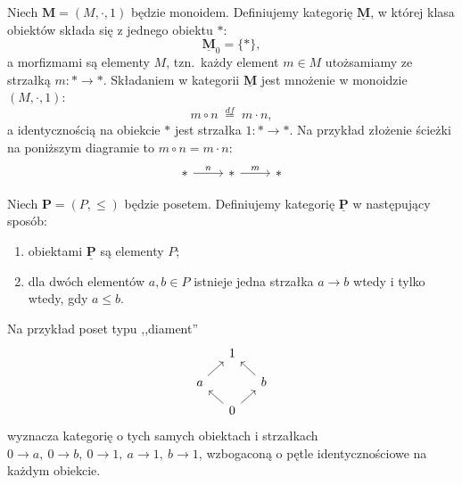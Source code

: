 \begin{przyklad}
Niech $\mathbf{M} = (M, \cdot, 1)$ będzie monoidem. Definiujemy kategorię $\underline{\mathbf{M}}$, w której klasa obiektów składa się z jednego obiektu $*$:
\[
\underline{\mathbf{M}}_0 = \{*\},
\]
a morfizmami są elementy $M$, tzn.\ każdy element $m \in M$ utożsamiamy ze strzałką $m \colon * \to *$. Składaniem w kategorii $\underline{\mathbf{M}}$ jest mnożenie w monoidzie $(M, \cdot, 1)$:
\[
m \circ n \;\stackrel{df}{=}\; m \cdot n,
\]
a identycznością na obiekcie $*$ jest strzałka $1 \colon * \to *$. Na przykład złożenie ścieżki na poniższym diagramie to $m \circ n = m \cdot n$:
\[
\begin{tikzcd}
* \ar[r, "n"] & * \ar[r, "m"] & *
\end{tikzcd}
\]
\end{przyklad}

\begin{przyklad}
Niech $\mathbf{P} = (P, \le)$ będzie posetem. Definiujemy kategorię $\underline{\mathbf{P}}$ w następujący sposób:
\begin{enumerate}
\item obiektami $\underline{\mathbf{P}}$ są elementy $P$;
\item dla dwóch elementów $a, b \in P$ istnieje jedna strzałka $a \to b$ wtedy i tylko wtedy, gdy $a \le b$.
\end{enumerate}
Na przykład poset typu ,,diament''
\[
\begin{tikzcd}[row sep=small,column sep=small]
 & 1 & \\
a \arrow[ur] & & b \arrow[ul] \\
 & 0 \arrow[ul] \arrow[ur] &
\end{tikzcd}
\]
wyznacza kategorię o tych samych obiektach i strzałkach $0 \to a,\ 0\to b,\ 0\to 1,\ a\to 1,\ b\to 1$, wzbogaconą o pętle identycznościowe na każdym obiekcie.
\end{przyklad}

